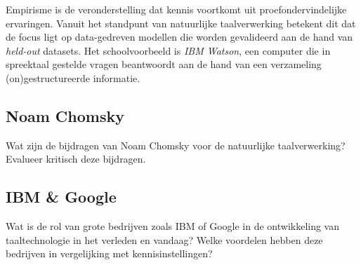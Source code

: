 \documentclass[../main.tex]{subfiles}
\begin{document}
\begin{solution}
Empirisme is de veronderstelling dat kennis voortkomt uit proefondervindelijke ervaringen.
Vanuit het standpunt van natuurlijke taalverwerking betekent dit dat de focus ligt op data-gedreven modellen die worden gevalideerd aan de hand van \emph{held-out} datasets.
Het schoolvoorbeeld is \emph{IBM Watson}, een computer die in spreektaal gestelde vragen beantwoordt aan de hand van een verzameling (on)gestructureerde informatie.
\end{solution}

\subsection{Noam Chomsky}
\begin{question}
Wat zijn de bijdragen van Noam Chomsky voor de natuurlijke taalverwerking?
Evalueer kritisch deze bijdragen.
\end{question}

\subsection{IBM \& Google}
\begin{question}
Wat is de rol van grote bedrijven zoals IBM of Google in de ontwikkeling van taaltechnologie in het verleden en vandaag?
Welke voordelen hebben deze bedrijven in vergelijking met kennisinstellingen?
\end{question}
\end{document}
